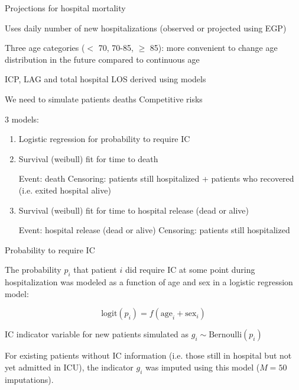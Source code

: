 \documentclass[t,9pt,xcolor=dvipsnames]{beamer}              %
\begin{document}
\begin{frame}{Projections for hospital mortality}
\justifying

Uses daily number of new hospitalizations (observed or projected using EGP)

Three age categories ($<$ 70, 70-85, $\geq$ 85): more convenient to change age distribution in the future compared to continuous age


ICP, LAG and total hospital LOS derived using models

We need to simulate patients deaths 
\alert{Competitive risks}




3 models:
\begin{enumerate}
\item Logistic regression for probability to require IC

\item Survival (weibull) fit for time to death

Event: death
Censoring: patients still hospitalized + patients who recovered (i.e. exited hospital alive) 

\item Survival (weibull) fit for time to hospital release (dead or alive)

Event: hospital release (dead or alive)
Censoring: patients still hospitalized

\end{enumerate}


\note{
\tiny
\justifying

}
\end{frame}

\begin{frame}{Probability to require IC}
\justifying

The probability $p_{i}$ that patient $i$ did require IC at some point during hospitalization was modeled as a function of age and sex in a logistic regression model:

\begin{equation*}
\text{logit}(p_{i})=f(\text{age}_{i}+\text{sex}_{i})
\end{equation*}

IC indicator variable for new patients simulated as $g_{i} \sim \text{Bernoulli}(p_{i})$

For existing patients without IC information (i.e. those still in hospital but not yet admitted in ICU), the indicator $g_{i}$ was imputed  using this model ($M=50$ imputations).

\note{
\tiny
\justifying

}
\end{frame}
\end{document}
